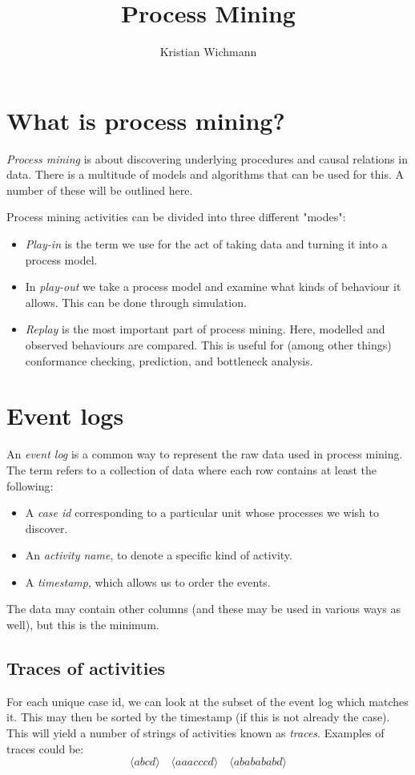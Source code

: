 \documentclass[12pt, a4paper]{article}
\title{Process Mining}
\author{Kristian Wichmann}
\numberwithin{equation}{section}
\begin{document}
\maketitle

\section{What is process mining?}
\textit{Process mining} is about discovering underlying procedures and causal relations in data. There is a multitude of models and algorithms that can be used for this. A number of these will be outlined here.

Process mining activities can be divided into three different "modes":

\begin{itemize}
\item \textit{Play-in} is the term we use for the act of taking data and turning it into a process model.
\item In \textit{play-out} we take a process model and examine what kinds of behaviour it allows. This can be done through simulation.
\item \textit{Replay} is the most important part of process mining. Here, modelled and observed behaviours are compared. This is useful for (among other things) conformance checking, prediction, and bottleneck analysis.
\end{itemize}

\section{Event logs}
An \textit{event log} is a common way to represent the raw data used in process mining. The term refers to a collection of data where each row contains at least the following:
\begin{itemize}
\item A \textit{case id} corresponding to a particular unit whose processes we wish to discover.
\item An \textit{activity name}, to denote a specific kind of activity.
\item A \textit{timestamp}, which allows us to order the events.
\end{itemize}
The data may contain other columns (and these may be used in various ways as well), but this is the minimum.

\subsection{Traces of activities}
For each unique case id, we can look at the subset of the event log which matches it. This may then be sorted by the timestamp (if this is not already the case). This will yield a number of strings of activities known as \textit{traces}. Examples of traces could be:
\begin{equation}
\langle abcd\rangle\quad\langle aaacccd\rangle\quad\langle ababababd\rangle
\end{equation}
\end{document}
